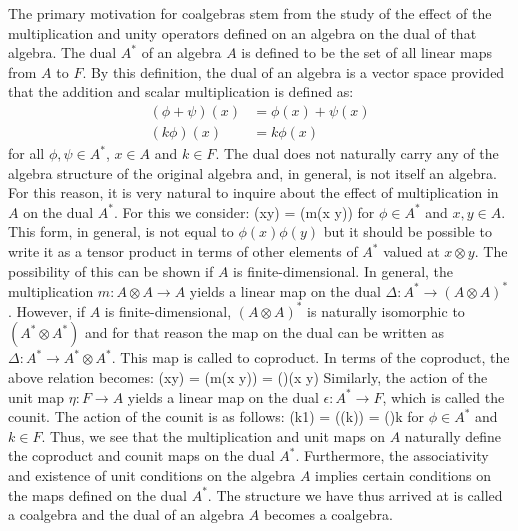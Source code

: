 The primary motivation for coalgebras stem from the study of the effect of the multiplication and unity
operators defined on an algebra on the dual of that algebra. The dual $A^*$ of an algebra $A$
is defined to be the set of all linear maps from $A$ to $F$. By this definition, the dual
of an algebra is a vector space provided that the addition and scalar multiplication is
defined as:
\begin{align}
(\phi + \psi)(x) & = \phi(x) + \psi(x) \\
(k\phi)(x) & = k \phi(x)
\end{align}
for all $\phi, \psi \in A^*$, $x \in A$ and $k \in F$. The dual does not
naturally carry any of the algebra structure of the original algebra and, in general,
is not itself an algebra. For this
reason, it is very natural to inquire about the effect of multiplication in $A$ on
the dual $A^*$. For this we consider:
\beq
\phi(xy) = \phi(m(x \otimes y))
\eeq
for $\phi \in A^*$ and $x,y \in A$. This form, in general, is not equal to $\phi(x) \phi(y)$
but it should be possible
to write it as a tensor product in terms of other elements of $A^*$ valued at $x \otimes y$. The
possibility of this can be shown if $A$ is finite-dimensional. In general, the multiplication
$m: A \otimes A \rightarrow A$ yields a linear map on the dual $\Delta: A^* \rightarrow
(A \otimes A)^*$. However, if $A$ is finite-dimensional, $(A \otimes A)^*$ is naturally isomorphic
to $(A^* \otimes A^*)$ and for that reason the map on the dual can be written as $\Delta: A^*
\rightarrow A^* \otimes A^*$. This map is called to coproduct. In terms of the coproduct, the
above relation becomes:
\beq
\phi(xy) = \phi(m(x \otimes y)) = \Delta(\phi)(x \otimes y)
\eeq
Similarly, the action of the unit map $\eta: F \rightarrow A$ yields a linear map on the
dual $\epsilon: A^* \rightarrow F$, which is called the counit. The action of the counit is
as follows:
\beq
\phi(k1) = \phi(\eta(k)) = \epsilon(\phi)k
\eeq
for $\phi \in A^*$ and $k \in F$. Thus, we see that the multiplication and unit maps on $A$
naturally define the coproduct and counit maps on the dual $A^*$. Furthermore, the associativity
and existence of unit conditions on the algebra $A$ implies certain conditions on the maps defined
on the dual $A^*$. The structure we have thus arrived at is called a coalgebra and the dual
of an algebra $A$ becomes a coalgebra.


